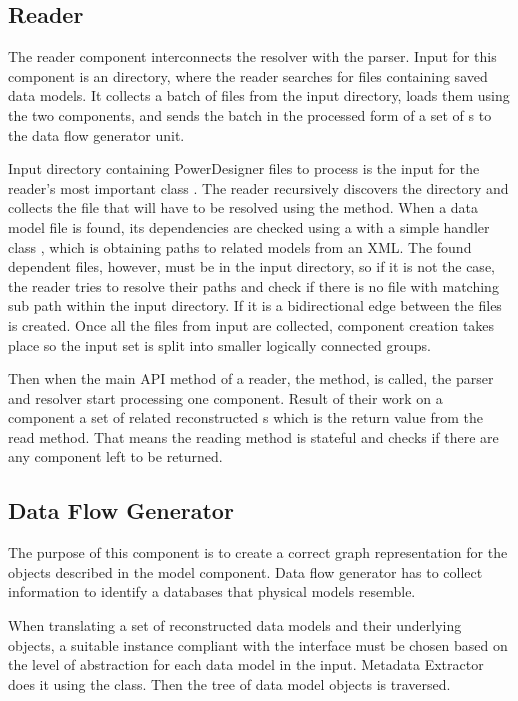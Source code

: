 \subsection{Reader}

The reader component interconnects the resolver with the parser. Input for this component is an directory, where the reader searches for files containing saved data models. It collects a batch of files from the input directory, loads them using the two components, and sends the batch in the processed form of a set of s to the data flow generator unit.

Input directory containing PowerDesigner files to process is the input for the reader's most important class . 
The reader recursively discovers the directory and collects the file that will have to be resolved using the  method. 
When a data model file is found, its dependencies are checked using a  with a simple handler class , which is obtaining paths to related models from an XML.
The found dependent files, however, must be in the input directory, so if it is not the case, the reader tries to resolve their paths and check if there is no file with matching sub path within the input directory. If it is a bidirectional edge between the files is created. 
Once all the files from input are collected, component creation takes place so the input set is split into smaller logically connected groups.

Then when the main API method of a reader, the  method, is called, the parser and resolver start processing one component. Result of their work on a component a set of related reconstructed s which is the return value from the read method. 
That means the reading method is stateful and  checks if there are any component left to be returned.

\subsection{Data Flow Generator}

The purpose of this component is to create a correct graph representation for the objects described in the model component. Data flow generator has to collect information to identify a databases that physical models resemble.

When translating a set of reconstructed data models and their underlying objects, a suitable instance compliant with the  interface must be chosen based on the level of abstraction for each data model  in the input. Metadata Extractor does it using the  class.
Then the tree of data model objects is traversed.
 
